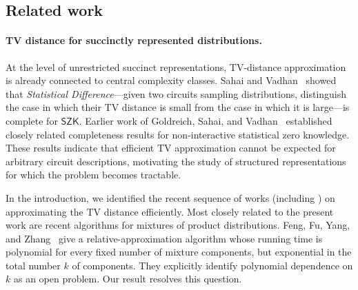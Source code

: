 \documentclass{article}
\newcommand{\ignore}[1]{}
\begin{document}
\subsection{Related work}
\label{sec:related-work}

\paragraph{TV distance for succinctly represented distributions.}
At the level of unrestricted succinct representations, TV-distance
approximation is already connected to central complexity classes.
Sahai and Vadhan~\cite{SV03} showed that \emph{Statistical Difference}---given two circuits sampling distributions, distinguish the case in which
their TV distance is small from the case in which it is  large---is complete
for $\mathsf{SZK}$. Earlier work of Goldreich, Sahai, and
Vadhan~\cite{GoldreichSV99} established closely related completeness results for
non-interactive statistical zero knowledge. These results indicate that
efficient TV approximation cannot be expected for arbitrary circuit
descriptions, motivating the study of structured representations for
which the problem becomes tractable. 

\ignore{For product distributions, Bhattacharyya et al.~\cite{BGMMPV23} proved
that exact TV computation is $\#\mathsf{P}$-complete, while also giving
approximation algorithms for restricted cases. Feng, Guo, Jerrum, and
Wang~\cite{FGJW23} subsequently gave an FPRAS for arbitrary product
distributions. Their algorithm uses a coupling-based importance-sampling
argument and remains polynomial-time even when the TV distance is very
small. Feng, Liu, and Liu~\cite{FLL24} gave a deterministic FPTAS based on
sparsification of the likelihood-ratio distribution, and extended their
techniques to Markov chains. Bhattacharyya et
al.~\cite{BGMMPV24} established a structure-preserving reduction from
relative TV approximation to probabilistic inference, yielding FPRASs for
same-structure Bayesian networks whenever inference can be performed
efficiently. Feng, Liu, and Yang~\cite{FLY25} obtained
relative-approximation algorithms for several classes of spin systems.}

In the introduction, we identified the recent sequence of works
(including \cite{bhattacharyya2025total, feng2023simple, feng2024soda})
on approximating the TV distance efficiently.
Most closely related to the present work are recent algorithms for
mixtures of product distributions. Feng, Fu, Yang, and
Zhang~\cite{feng2026computing, Fu26} give a relative-approximation algorithm
whose running time is polynomial for every fixed number of mixture
components, but exponential in the total number $k$ of components.
They explicitly identify polynomial dependence
on $k$ as an open problem. Our result resolves this question.
\end{document}
